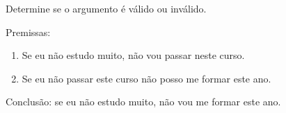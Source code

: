 \item Determine se o argumento é válido ou inválido.

Premissas:
\begin{enumerate}
\item Se eu não estudo muito, não vou passar neste curso.
\item Se eu não passar este curso não posso me formar este ano.
\end{enumerate}

Conclusão: se eu não estudo muito, não vou me formar este ano.
